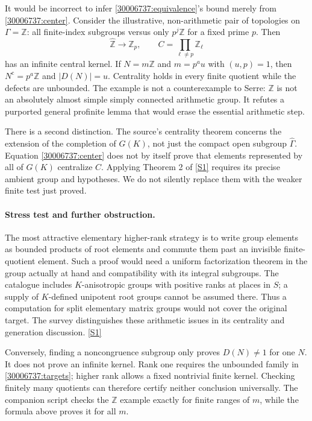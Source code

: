 \documentclass[11pt,a4paper]{article}
\newcommand{\Z}{\mathbb{Z}}
\newcommand{\sref}[2]{\hyperlink{source:#1:#2}{[S#2]}}
\numberwithin{equation}{section}
\begin{document}
It would be incorrect to infer \eqref{30006737:equivalence}'s bound merely
from \eqref{30006737:center}.  Consider the illustrative, non-arithmetic
pair of topologies on $\Gamma=\Z$: all finite-index subgroups versus only
$p^j\Z$ for a fixed prime $p$.  Then
\[
 \widehat{\Z}\longrightarrow\Z_p,
 \qquad C=\prod_{\ell\ne p}\Z_\ell
\]
has an infinite central kernel.  If $N=m\Z$ and
$m=p^a u$ with $(u,p)=1$, then $N^{\mathrm c}=p^a\Z$ and
$|D(N)|=u$.  Centrality holds in every finite quotient while the defects
are unbounded.  The example is not a counterexample to Serre: $\Z$ is
not an absolutely almost simple simply connected arithmetic group.
It refutes a purported general profinite lemma that would erase the
essential arithmetic step.

There is a second distinction.  The source's centrality theorem concerns
the extension of the completion of $G(K)$, not just the compact open
subgroup $\widehat\Gamma$.  Equation \eqref{30006737:center} does not by itself
prove that elements represented by all of $G(K)$ centralize $C$.
Applying Theorem 2 of \sref{30006737}{1} requires its precise ambient group
and hypotheses.  We do not silently replace them with the weaker
finite test just proved.

\paragraph{Stress test and further obstruction.}
The most attractive elementary higher-rank strategy is to write group
elements as bounded products of root elements and commute them past an
invisible finite-quotient element.  Such a proof would need a uniform
factorization theorem in the group actually at hand and compatibility
with its integral subgroups.  The catalogue includes $K$-anisotropic
groups with positive ranks at places in $S$; a supply of $K$-defined
unipotent root groups cannot be assumed there.  Thus a computation for
split elementary matrix groups would not cover the original target.
The survey distinguishes these arithmetic issues in its centrality
and generation discussion. \sref{30006737}{1}

Conversely, finding a noncongruence subgroup only proves $D(N)\ne1$ for
one $N$.  It does not prove an infinite kernel.  Rank one requires the
unbounded family in \eqref{30006737:targets}; higher rank allows a fixed
nontrivial finite kernel.  Checking finitely many quotients can therefore
certify neither conclusion universally.  The companion script checks
the $\Z$ example exactly for finite ranges of $m$, while the formula
above proves it for all $m$.
\end{document}

